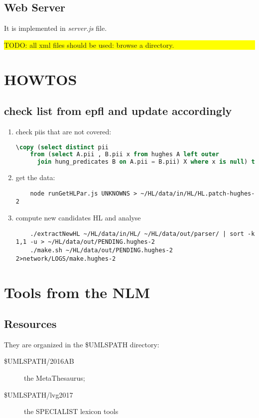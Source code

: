 \documentclass[a4paper,11pt]{report}
\newcommand{\TODO}[1]{\begin{center}\bfseries \colorbox{yellow}{\parbox{0.9\textwidth}{TODO: #1}}\end{center}}
\begin{document}
\section{Web Server}
It is implemented in \emph{server.js} file. 

\TODO{all xml files should be used: browse a directory.}

\chapter{HOWTOS}
\section{check list from epfl and update accordingly}
\begin{enumerate}
\item check piis that are not covered:
  \begin{lstlisting}[language=SQL]
    \copy (select distinct pii
    from (select A.pii , B.pii x from hughes A left outer
      join hung_predicates B on A.pii = B.pii) X where x is null) to 'UNKNOWNS';
  \end{lstlisting}
\item get the data:
  \begin{lstlisting}
    node runGetHLPar.js UNKNOWNS > ~/HL/data/in/HL/HL.patch-hughes-2
  \end{lstlisting}
\item compute new candidates HL and analyse
  \begin{lstlisting}
    ./extractNewHL ~/HL/data/in/HL/ ~/HL/data/out/parser/ | sort -k 1,1 -u > ~/HL/data/out/PENDING.hughes-2
    ./make.sh ~/HL/data/out/PENDING.hughes-2 2>network/LOGS/make.hughes-2
  \end{lstlisting}
\end{enumerate}


\chapter{Tools from the NLM}
\section{Resources}
They are organized in the \$UMLSPATH directory:
\begin{description}
\item[\$UMLSPATH/2016AB] the MetaThesaurus;
\item[\$UMLSPATH/lvg2017] the SPECIALIST lexicon tools
\end{description}
\end{document}

